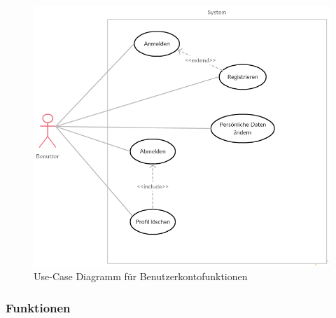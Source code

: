 \documentclass[parskip=full]{scrartcl}
\begin{document}
\begin{figure}[H]
	\centering
	\includegraphics[width=.7\textwidth]{Use_Cases/use_case_Benutzerprofil.png}
	\caption{Use-Case Diagramm für Benutzerkontofunktionen}	
\end{figure}

\subsubsection{Funktionen}
\end{document}
